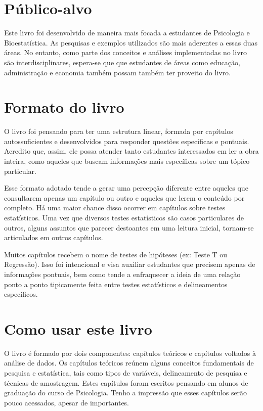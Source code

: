 \documentclass[
]{book}
\begin{document}
\hypertarget{puxfablico-alvo}{%
\section{Público-alvo}\label{puxfablico-alvo}}

Este livro foi desenvolvido de maneira mais focada a estudantes de
Psicologia e Bioestatística. As pesquisas e exemplos utilizados são mais
aderentes a essas duas áreas. No entanto, como parte dos conceitos e
análises implementadas no livro são interdisciplinares, espera-se que
que estudantes de áreas como educação, administração e economia também
possam também ter proveito do livro.

\hypertarget{formato-do-livro}{%
\section{Formato do livro}\label{formato-do-livro}}

O livro foi pensando para ter uma estrutura linear, formada por
capítulos autossuficientes e desenvolvidos para responder questões
específicas e pontuais. Acredito que, assim, ele possa atender tanto
estudantes interessados em ler a obra inteira, como aqueles que buscam
informações mais específicas sobre um tópico particular.

Esse formato adotado tende a gerar uma percepção diferente entre aqueles
que consultarem apenas um capítulo ou outro e aqueles que lerem o
conteúdo por completo. Há uma maior chance disso ocorrer em capítulos
sobre testes estatísticos. Uma vez que diversos testes estatísticos são
casos particulares de outros, alguns assuntos que parecer destoantes em
uma leitura inicial, tornam-se articulados em outros capítulos.

Muitos capítulos recebem o nome de testes de hipóteses (ex: Teste T ou
Regressão). Isso foi intencional e visa auxiliar estudantes que precisem
apenas de informações pontuais, bem como tende a enfraquecer a ideia de
uma relação ponto a ponto tipicamente feita entre testes estatísticos e
delineamentos específicos.

\hypertarget{como-usar-este-livro}{%
\section{Como usar este livro}\label{como-usar-este-livro}}

O livro é formado por dois componentes: capítulos teóricos e capítulos
voltados à análise de dados. Os capítulos teóricos reúnem alguns
conceitos fundamentais de pesquisa e estatística, tais como tipos de
variáveis, delineamento de pesquisa e técnicas de amostragem. Estes
capítulos foram escritos pensando em alunos de graduação do curso de
Psicologia. Tenho a impressão que esses capítulos serão pouco acessados,
apesar de importantes.
\end{document}
